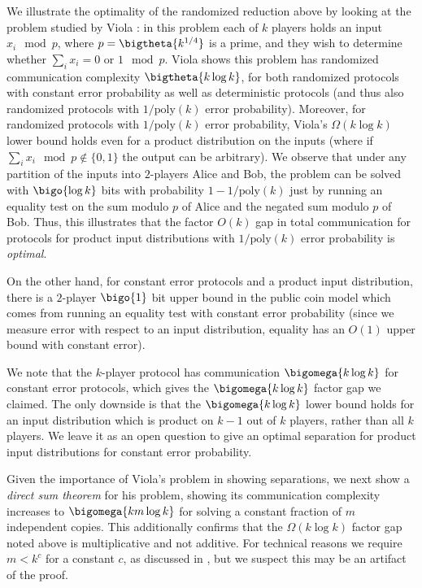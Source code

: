 We illustrate the optimality of the randomized reduction above by
looking at the \sumequal problem studied by Viola \cite{Viola:2013we}:
in this problem each of $k$ players holds an input $x_i \mod p$, where
$p = \bigtheta{k^{1/4}}$ is a prime, and they wish to determine whether
$\sum_i x_i = 0$ or $1 \mod p$. Viola shows
this problem has randomized communication complexity $\bigtheta{k \log k}$, 
for both randomized protocols with constant error probability as well
as deterministic protocols (and thus also randomized protocols with
$1/\textrm{poly}(k)$ error probability). Moreover, for randomized protocols
with $1/\textrm{poly}(k)$ error probability, Viola's $\Omega(k \log k)$
lower bound holds even for a product distribution on the inputs (where
if $\sum_i x_i \mod p \notin \{0,1\}$ the output can be arbitrary).  
We observe that under any partition of the inputs into $2$-players
Alice and Bob,
the problem can be solved with $\bigo{\log k}$ bits with probability
$1-1/\textrm{poly}(k)$ just by running an equality test on the sum
modulo $p$ of Alice and the negated sum modulo $p$ of Bob. Thus, this
illustrates that the factor $O(k)$ gap in total communication for protocols for product input 
distributions with $1/\textrm{poly}(k)$ error probability is \emph{optimal}. 

On the other hand, for constant error protocols and a product input 
distribution, there is a 
$2$-player $\bigo{1}$ bit upper bound in the public coin model which comes
from running an equality test with constant error probability
(since we measure error with respect to an input distribution, equality
has an $O(1)$ upper bound with constant error). 

We note that the $k$-player protocol has communication $\bigomega{k \log k}$
for constant error protocols, 
which gives the $\bigomega{k \log k}$ factor gap we claimed. The only
downside is that the $\bigomega{k \log k}$ lower bound  holds for an input 
distribution which is product
on $k-1$ out of $k$ players, rather than all $k$ players. We leave it as an open question
to give an optimal separation for product input distributions for 
constant error probability. 


Given the importance of Viola's problem in showing separations, 
we next show a \emph{direct sum theorem} for his problem,
showing its communication complexity increases to $\bigomega{km \log k }$
for solving a constant fraction of $m$ independent copies. This additionally confirms that the $\Omega(k \log k)$ factor gap noted above is multiplicative and not additive. {\color{black}For technical reasons we require $m < k^c$ for a constant $c$, as discussed in , but we suspect this may be an artifact of the proof.}

